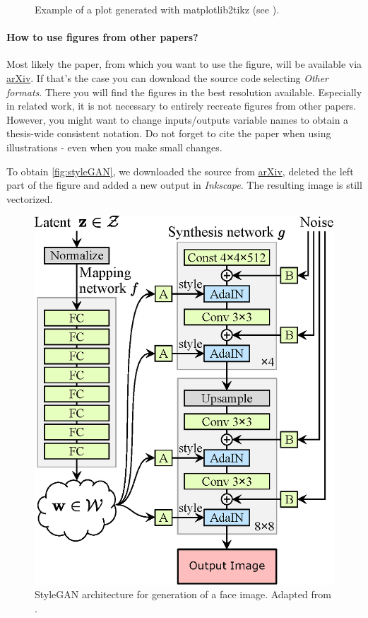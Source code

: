 \begin{figure}[H]
  \centering
  \newlength\figureheight
\newlength\figurewidth
\setlength\figureheight{4cm}
\setlength{}

  \caption{Example of a plot generated with matplotlib2tikz (see \cite{hoerman2019ORNAN}).}
  \label{fig:plot}
\end{figure}


\paragraph*{How to use figures from other papers?}
Most likely the paper, from which you want to use the figure, will be available via \href{https://arxiv.org/}{arXiv}. If that's the case you can download the source code selecting \textit{Other formats}. There you will find the figures in the best resolution available.
Especially in related work, it is not necessary to entirely recreate figures from other papers. However, you might want to change inputs/outputs variable names to obtain a thesis-wide consistent notation. Do not forget to cite the paper when using illustrations - even when you make small changes.

To obtain \autoref{fig:styleGAN}, we downloaded the source from  \href{https://arxiv.org/format/1812.04948}{arXiv}, deleted the left part of the figure and added a new output in \textit{Inkscape}. The resulting image is still vectorized.
\begin{figure}[H]
  \centering
\includegraphics[width=0.75\linewidth]{figures/StyleGAN.eps}
  \caption{StyleGAN architecture for generation of a face image. Adapted from \cite{karras2019style}.}
  \label{fig:styleGAN}
\end{figure}

